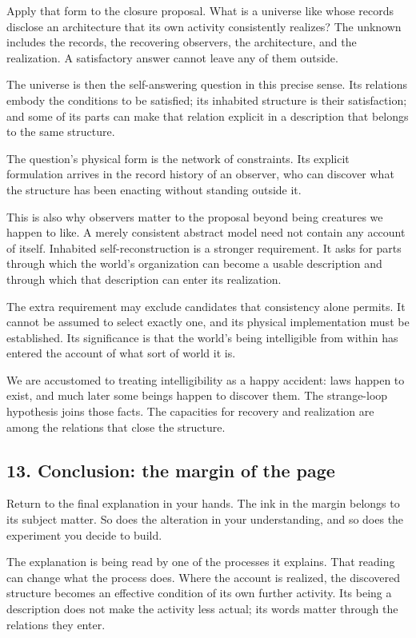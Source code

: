 \documentclass[
  11pt,
]{article}
\begin{document}
Apply that form to the closure proposal. What is a universe like whose
records disclose an architecture that its own activity consistently
realizes? The unknown includes the records, the recovering observers,
the architecture, and the realization. A satisfactory answer cannot
leave any of them outside.

The universe is then the self-answering question in this precise sense.
Its relations embody the conditions to be satisfied; its inhabited
structure is their satisfaction; and some of its parts can make that
relation explicit in a description that belongs to the same structure.

The question's physical form is the network of constraints. Its explicit
formulation arrives in the record history of an observer, who can
discover what the structure has been enacting without standing outside
it.

This is also why observers matter to the proposal beyond being creatures
we happen to like. A merely consistent abstract model need not contain
any account of itself. Inhabited self-reconstruction is a stronger
requirement. It asks for parts through which the world's organization
can become a usable description and through which that description can
enter its realization.

The extra requirement may exclude candidates that consistency alone
permits. It cannot be assumed to select exactly one, and its physical
implementation must be established. Its significance is that the world's
being intelligible from within has entered the account of what sort of
world it is.

We are accustomed to treating intelligibility as a happy accident: laws
happen to exist, and much later some beings happen to discover them. The
strange-loop hypothesis joins those facts. The capacities for recovery
and realization are among the relations that close the structure.

\newpage

\subsection{13. Conclusion: the margin of the
page}\label{conclusion-the-margin-of-the-page}

Return to the final explanation in your hands. The ink in the margin
belongs to its subject matter. So does the alteration in your
understanding, and so does the experiment you decide to build.

The explanation is being read by one of the processes it explains. That
reading can change what the process does. Where the account is realized,
the discovered structure becomes an effective condition of its own
further activity. Its being a description does not make the activity
less actual; its words matter through the relations they enter.
\end{document}
